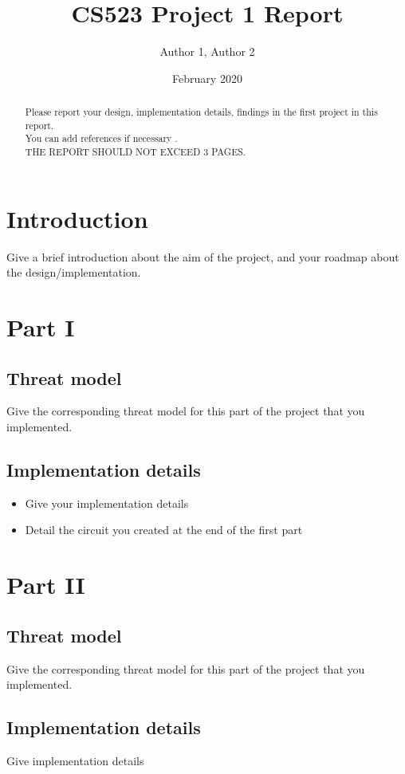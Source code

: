 \documentclass[10pt,conference,compsocconf]{IEEEtran}
\title{CS523 Project 1 Report}
\author{Author 1, Author 2}
\date{February 2020}
\begin{document}
\maketitle

\begin{abstract}
    Please report your design, implementation details, findings in the first project in this report. \\
    You can add references if necessary \cite{article}. \\
    THE REPORT SHOULD NOT EXCEED 3 PAGES.
\end{abstract}
\section{Introduction}
Give a brief introduction about the aim of the project, and your roadmap about the design/implementation.
\section{Part I}

\subsection{Threat model}
Give the corresponding threat model for this part of the project that you implemented. 
\subsection{Implementation details}
\begin{itemize}
    \item Give your implementation details
    \item Detail the circuit you created at the end of the first part
\end{itemize}
\section{Part II}
\subsection{Threat model}
Give the corresponding threat model for this part of the project that you implemented. 
\subsection{Implementation details}
Give implementation details
\end{document}
